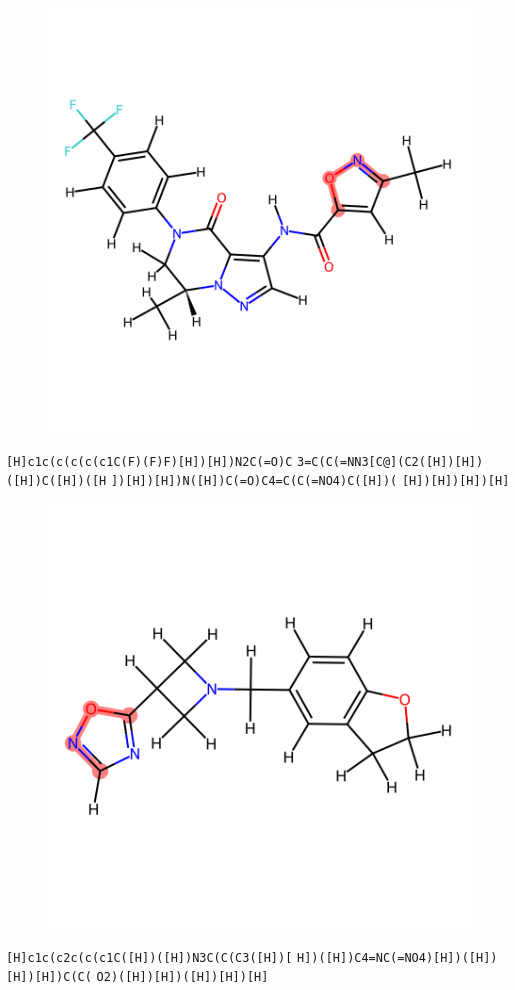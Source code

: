 \documentclass{article}
\begin{document}
\begin{figure}[ht]
\centering
    \includegraphics{mol128.png}
\end{figure}
\verb|[H]c1c(c(c(c(c1C(F)(F)F)[H])[H])N2C(=O)C| \verb|3=C(C(=NN3[C@](C2([H])[H])([H])C([H])([H| \verb|])[H])[H])N([H])C(=O)C4=C(C(=NO4)C([H])(| \verb|[H])[H])[H])[H]|

\begin{figure}[ht]
\centering
    \includegraphics{mol129.png}
\end{figure}
\verb|[H]c1c(c2c(c(c1C([H])([H])N3C(C(C3([H])[| \verb|H])([H])C4=NC(=NO4)[H])([H])[H])[H])C(C(| \verb|O2)([H])[H])([H])[H])[H]|
\end{document}
